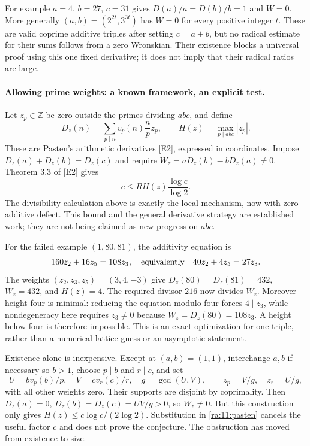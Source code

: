 \documentclass[11pt]{article}
\begin{document}
For example $a=4$, $b=27$, $c=31$ gives
$D(a)/a=D(b)/b=1$ and $W=0$. More generally
$(a,b)=(2^{2t},3^{3t})$ has $W=0$ for every positive integer $t$.
These are valid coprime additive triples after setting $c=a+b$,
but no radical estimate for their sums follows from a zero Wronskian.
Their existence blocks a universal proof using this one fixed derivative;
it does not imply that their radical ratios are large.

\paragraph{Allowing prime weights: a known framework, an explicit test.}
Let $z_p\in\mathbb Z$ be zero outside the primes dividing $abc$, and
define
\[
 D_z(n)=\sum_{p\mid n}v_p(n)\frac np z_p,
 \qquad H(z)=\max_{p\mid abc}|z_p|.
\]
These are Pasten's arithmetic derivatives [E2], expressed in coordinates.
Impose $D_z(a)+D_z(b)=D_z(c)$ and require
$W_z=aD_z(b)-bD_z(a)\ne0$. Theorem 3.3 of [E2] gives
\begin{equation}\label{ra:11:pasten}
 c\le R H(z)\frac{\log c}{\log2}.
\end{equation}
The divisibility calculation above is exactly the local mechanism, now
with zero additive defect. This bound and the general derivative strategy
are established work; they are not being claimed as new progress on $abc$.

For the failed example $(1,80,81)$, the additivity equation is
\[
 160z_2+16z_5=108z_3,
 \quad\hbox{equivalently}\quad40z_2+4z_5=27z_3.
\]
The weights $(z_2,z_3,z_5)=(3,4,-3)$ give
$D_z(80)=D_z(81)=432$, $W_z=432$, and $H(z)=4$.
The required divisor $216$ now divides $W_z$.
Moreover height four is minimal: reducing the equation modulo four forces
$4\mid z_3$, while nondegeneracy here requires $z_3\ne0$ because
$W_z=D_z(80)=108z_3$. A height below four is therefore impossible.
This is an exact optimization for one triple, rather than a numerical
lattice guess or an asymptotic statement.

Existence alone is inexpensive. Except at $(a,b)=(1,1)$, interchange
$a,b$ if necessary so $b>1$, choose $p\mid b$ and $r\mid c$, and set
\[
 U=bv_p(b)/p,\quad V=cv_r(c)/r,\quad g=\gcd(U,V),
 \qquad z_p=V/g,\quad z_r=U/g,
\]
with all other weights zero. Their supports are disjoint by coprimality.
Then $D_z(a)=0$, $D_z(b)=D_z(c)=UV/g>0$, so $W_z\ne0$.
But this construction only gives
$H(z)\le c\log c/(2\log2)$. Substitution in
\eqref{ra:11:pasten} cancels the useful factor $c$ and does not prove
the conjecture. The obstruction has moved from existence to size.
\end{document}
